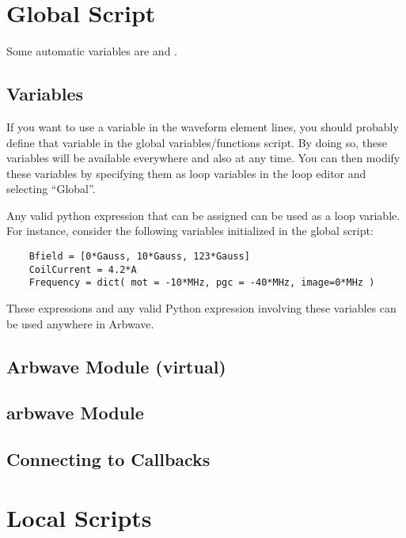 \thispagestyle{fancy}
\pagestyle{fancy}
\section{Global Script}
    Some automatic variables are  and .

  \subsection{Variables} \label{script:variables}
    If you want to use a variable in the waveform element lines, you should
    probably define that variable in the global variables/functions script.  By
    doing so, these variables will be available everywhere and also at any time.
    You can then modify these variables by specifying them as loop variables in
    the loop editor and selecting ``Global''.

    Any valid python expression that can be assigned can be used as a loop
    variable.  For instance, consider the following variables initialized in the
    global script:

    \begin{verbatim}
    Bfield = [0*Gauss, 10*Gauss, 123*Gauss]
    CoilCurrent = 4.2*A
    Frequency = dict( mot = -10*MHz, pgc = -40*MHz, image=0*MHz )
    \end{verbatim}

    These expressions and any valid Python expression involving these variables
    can be used anywhere in Arbwave.

  \subsection{\textbf{Arbwave} Module (virtual)}
  \subsection{\textbf{arbwave} Module}
  \subsection{Connecting to Callbacks}

\section{Local Scripts}
